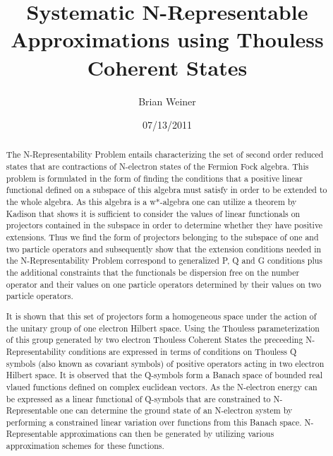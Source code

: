 \documentclass[aps,preprint]{revtex4}%
\begin{document}
\preprint{ }
\title[N-Representable Approximations]{Systematic N-Representable Approximations using Thouless Coherent States}
\author{Brian Weiner}

\begin{abstract}
The N-Representability Problem entails characterizing the set of second order
reduced states that are contractions of N-electron states of the Fermion Fock
algebra. This problem is formulated in the form of finding the conditions that
a positive linear functional defined on a subspace of this algebra must
satisfy in order to be extended to the whole algebra. As this algebra is a
w*-algebra one can utilize a theorem by Kadison that shows it is sufficient to
consider the values of linear functionals on projectors contained in the
subspace in order to determine whether they have positive extensions. Thus we
find the form of projectors belonging to the subspace of one and two particle
operators and subsequently show that the extension conditions needed in the
N-Representability Problem correspond to generalized P, Q and G conditions
plus the additional constraints that the functionals be dispersion free on the
number operator and their values on one particle operators determined by their
values on two particle operators.

It is shown that this set of projectors form a homogeneous space under the
action of the unitary group of one electron Hilbert space. Using the Thouless
parameterization of this group generated by two electron Thouless Coherent
States the preceeding N-Representability conditions are expressed in terms of
conditions on Thouless Q symbols (also known as covariant symbols) of positive
operators acting in two electron Hilbert space. It is observed that the
Q-symbols form a Banach space of bounded real vlaued functions defined on
complex euclidean vectors. As the N-electron energy can be expressed as a
linear functional of Q-symbols that are constrained to N-Representable one can
determine the ground state of an N-electron system by performing a constrained
linear variation over functions from this Banach space. N-Representable
approximations can then be generated by utilizing various approximation
schemes for these functions.

\end{abstract}
\date{07/13/2011}
\maketitle
\tableofcontents
\end{document}
